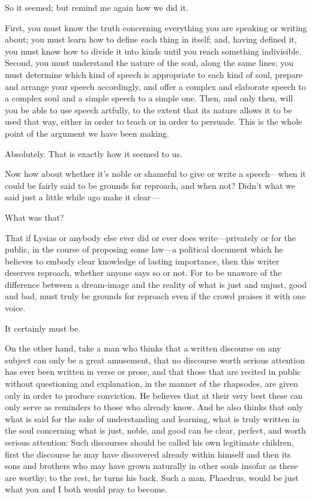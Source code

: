 \sayphaedrus So it seemed; but remind me again how we did it.

\saysocrates First, you must know the truth concerning everything you are
speaking or writing about; you must learn how to define each thing in
itself; and, having defined it, you must know how to divide it into
kinds until you reach something indivisible. Second, you must understand
the nature of the soul, along the same lines; you must determine which
kind of speech is appropriate to each kind of soul, prepare and
arrange your speech accordingly, and offer a complex and elaborate
speech to a complex soul and a simple speech to a simple one. Then, and
only then, will you be able to use speech artfully, to the extent that
its nature allows it to be used that way, either in order to teach or in
order to persuade. This is the whole point of the argument we have been
making.

\sayphaedrus Absolutely. That is exactly how it seemed to us.

\saysocrates Now how about whether it’s noble or shameful to give
or write a speech---when it could be fairly said to be grounds for
reproach, and when not? Didn’t what we said just a little while ago make
it clear---

\sayphaedrus What was that?

\saysocrates That if Lysias or anybody else ever did or ever does
write---privately or for the public, in the course of proposing some
law---a political document which he believes to embody clear knowledge
of lasting importance, then this writer deserves reproach, whether
anyone says so or not. For to be unaware of the difference between a
dream-image and the reality of what is just and unjust, good and
bad, must truly be grounds for reproach even if the crowd praises it
with one voice.

\sayphaedrus It certainly must be.

\saysocrates On the other hand, take a man who thinks that a written
discourse on any subject can only be a great amusement, that no
discourse worth serious attention has ever been written in verse or
prose, and that those that are recited in public without questioning and
explanation, in the manner of the rhapsodes, are given
only in order to produce conviction. He believes that at their very best
these can only serve as reminders to those who already know. And he also
thinks that only what is said for the sake of understanding and
learning, what is truly written in the soul concerning what is just,
noble, and good can be clear, perfect, and worth serious attention: Such
discourses should be called his own legitimate children, first the
discourse he may have discovered already within himself and then
its sons and brothers who may have grown naturally in other souls
insofar as these are worthy; to the rest, he turns his back. Such a man,
Phaedrus, would be just what you and I both would pray to become.


